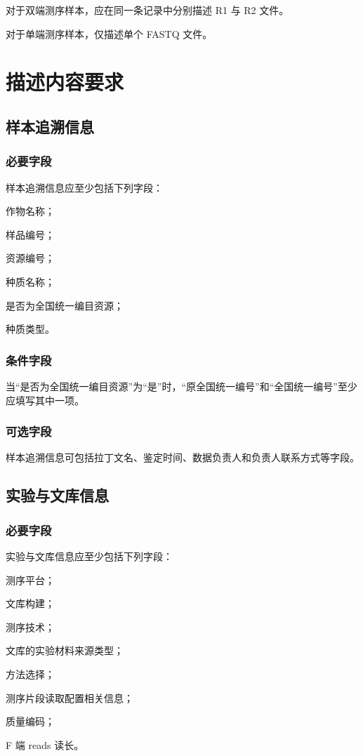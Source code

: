 对于双端测序样本，应在同一条记录中分别描述 R1 与 R2 文件。

对于单端测序样本，仅描述单个 FASTQ 文件。

\chapter{描述内容要求}
\section{样本追溯信息}
\subsection{必要字段}
样本追溯信息应至少包括下列字段：

作物名称；

样品编号；

资源编号；

种质名称；

是否为全国统一编目资源；

种质类型。

\subsection{条件字段}
当“是否为全国统一编目资源”为“是”时，“原全国统一编号”和“全国统一编号”至少应填写其中一项。

\subsection{可选字段}
样本追溯信息可包括拉丁文名、鉴定时间、数据负责人和负责人联系方式等字段。

\section{实验与文库信息}
\subsection{必要字段}
实验与文库信息应至少包括下列字段：

测序平台；

文库构建；

测序技术；

文库的实验材料来源类型；

方法选择；

测序片段读取配置相关信息；

质量编码；

F 端 reads 读长。

